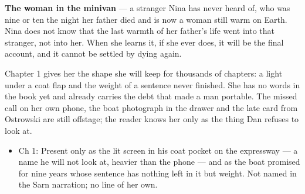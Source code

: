 \documentclass{design/chronicle}
\begin{document}
{\textbf{The woman in the minivan} — a stranger Nina has never heard of, who was nine or ten the night her father died and is now a woman still warm on Earth. Nina does not know that the last warmth of her father’s life went into that stranger, not into her. When she learns it, if she ever does, it will be the final account, and it cannot be settled by dying again.

Chapter 1 gives her the shape she will keep for thousands of chapters: a light under a coat flap and the weight of a sentence never finished. She has no words in the book yet and already carries the debt that made a man portable. The missed call on her own phone, the boat photograph in the drawer and the late card from Ostrowski are still offstage; the reader knows her only as the thing Dan refuses to look at.

\begin{itemize}[leftmargin=1.4em,itemsep=1pt,topsep=3pt,parsep=0pt]

\item Ch 1: Present only as the lit screen in his coat pocket on the expressway --- a name he will not look at, heavier than the phone --- and as the boat promised for nine years whose sentence has nothing left in it but weight. Not named in the Sarn narration; no line of her own.

\end{itemize}
}
\end{document}

